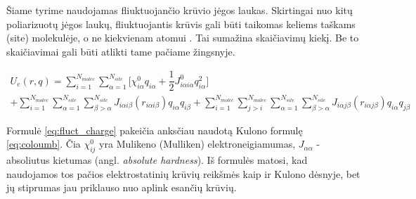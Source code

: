 Šiame tyrime naudojamas fliuktuojančio krūvio jėgos laukas.
Skirtingai nuo kitų poliarizuotų jėgos laukų, fliuktuojantis krūvis gali būti taikomas keliems taškams (site) molekulėje, o ne kiekvienam atomui \cite{polar}.
Tai sumažina skaičiavimų kiekį. Be to skaičiavimai gali būti atlikti tame pačiame žingsnyje.

\begin{multline} \label{eq:fluct_charge}
U_{e}(r, q) = \sum\limits_{i=1}^{N_{molec}} \sum\limits_{\alpha=1}^{N_{site}}
{\bigg[\chi_{i\alpha}^0 q_{i\alpha} + \dfrac{1} {2} J_{i\alpha i\alpha}^0 q_{i\alpha}^2 \bigg]} \\
+ \sum\limits_{i=1}^{N_{molec}} \sum\limits_{\alpha=1}^{N_{site}} \sum\limits_{\beta>\alpha}^{N_{site}}
{J_{i\alpha i\beta} (r_{i\alpha i\beta}) q_{i\alpha} q_{i\beta}}
+ \sum\limits_{i=1}^{N_{molec}} \sum\limits_{j>i}^{N_{molec}} \sum\limits_{\alpha=1}^{N_{site}} \sum\limits_{\beta>\alpha}^{N_{site}}
{J_{i\alpha j\beta} (r_{i\alpha j\beta}) q_{i\alpha} q_{j\beta}}
\end{multline}

Formulė \ref{eq:fluct_charge} pakeičia anksčiau naudotą Kulono formulę \ref{eq:coloumb}.
Čia \(\chi_{ij}^0\) yra Mulikeno (Mulliken) elektroneigiamumas, \(J_{\alpha\alpha}\) - absoliutus kietumas (angl. \textit{absolute hardness}).
Iš formulės matosi, kad naudojamos tos pačios elektrostatinių krūvių reikšmės kaip ir Kulono dėsnyje,
bet jų stiprumas jau priklauso nuo aplink esančių krūvių.


%
%
%
%
